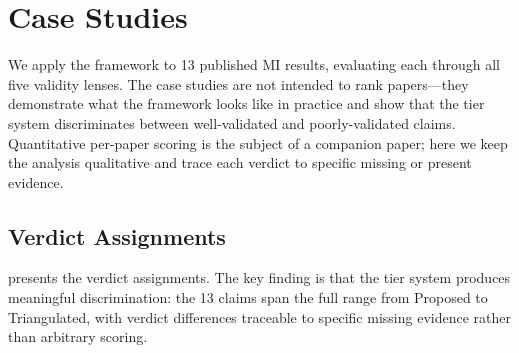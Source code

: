 \documentclass[10pt]{article}
\begin{document}
\section{Case Studies}
\label{sec:case-studies}

We apply the framework to 13 published MI results, evaluating each through all five validity lenses. The case studies are not intended to rank papers---they demonstrate what the framework looks like in practice and show that the tier system discriminates between well-validated and poorly-validated claims. Quantitative per-paper scoring is the subject of a companion paper; here we keep the analysis qualitative and trace each verdict to specific missing or present evidence.

\subsection{Verdict Assignments}

 presents the verdict assignments. The key finding is that the tier system produces meaningful discrimination: the 13 claims span the full range from Proposed to Triangulated, with verdict differences traceable to specific missing evidence rather than arbitrary scoring.
\end{document}
